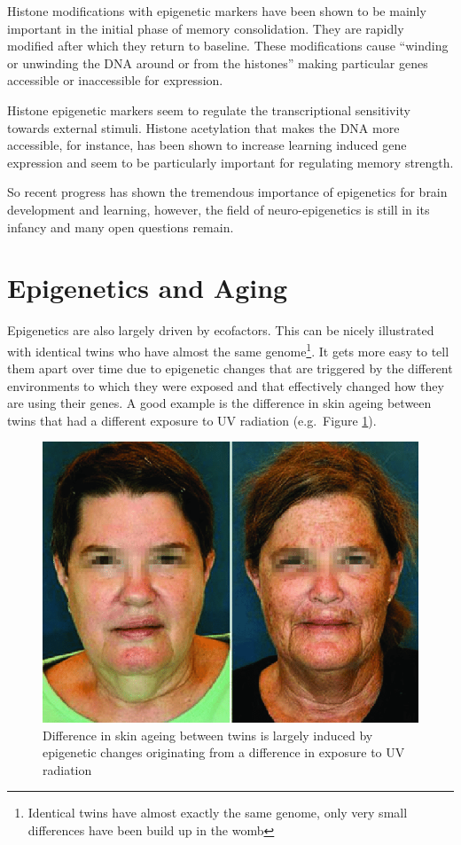 \documentclass[
  11pt,
]{book}
\begin{document}
Histone modifications with epigenetic markers have been shown to be mainly important in the initial phase of memory consolidation. They are rapidly modified after which they return to baseline. These modifications cause ``winding or unwinding the DNA around or from the histones'' making particular genes accessible or inaccessible for expression.

Histone epigenetic markers seem to regulate the transcriptional sensitivity towards external stimuli. Histone acetylation that makes the DNA more accessible, for instance, has been shown to increase learning induced gene expression and seem to be particularly important for regulating memory strength.

So recent progress has shown the tremendous importance of epigenetics for brain development and learning, however, the field of neuro-epigenetics is still in its infancy and many open questions remain.

\hypertarget{epigenetics-and-aging}{%
\section{Epigenetics and Aging}\label{epigenetics-and-aging}}

Epigenetics are also largely driven by ecofactors. This can be nicely illustrated with identical twins who have almost the same genome\footnote{Identical twins have almost exactly the same genome, only very small differences have been build up in the womb}. It gets more easy to tell them apart over time due to epigenetic changes that are triggered by the different environments to which they were exposed and that effectively changed how they are using their genes. A good example is the difference in skin ageing between twins that had a different exposure to UV radiation (e.g.~Figure \ref{fig:epiUV}).



\begin{figure}

{\centering \includegraphics[width=0.5\linewidth]{./figs/dentical-twins-with-phenotypic-discordance-due-to-environmental-exposure-Although-MZ} 

}

\caption{Difference in skin ageing between twins is largely induced by epigenetic changes originating from a difference in exposure to UV radiation \citep{Schwab2017}}\label{fig:epiUV}
\end{figure}
\end{document}
